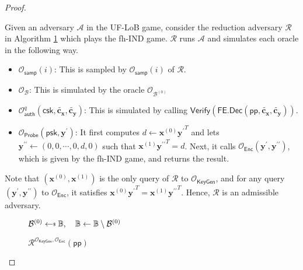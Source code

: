 \begin{proof}
\label{proof:ind-uf-lob3}

Given an adversary $\mathcal{A}$ in the \textsf{UF-LoB} game, consider the reduction adversary $\mathcal{R}$ in Algorithm \ref{alg:reduction1-ind-uf-lob3_game} which plays the \textsf{fh-IND} game. $\mathcal{R}$ runs $\mathcal{A}$ and simulates each oracle in the following way.

\begin{itemize}
	\item $\mathcal{O}_{\textsf{samp}}(i)$: This is sampled by $\mathcal{O}_{\textsf{samp}}(i)$ of $\mathcal{R}$.
	
	\item $\mathcal{O}_{\mathcal{B}}$: This is simulated by the oracle $\mathcal{O}_{\mathcal{B}^{(0)}}$

	\item $\mathcal{O}_{\textsf{auth}}^q (\textsf{csk}, \mathbf{\tilde{c_x}}, \mathbf{\tilde{c_y}})$: This is simulated by calling $\textsf{Verify}( \textsf{FE.Dec}(\textsf{pp}, \mathbf{\tilde{c_x}}, \mathbf{\tilde{c_y}}) )$.

	\item $\mathcal{O}_{\textsf{Probe}}( \textsf{psk}, \mathbf{y}^\prime )$: It first computes $d \gets \mathbf{x}^{(0)}{\mathbf{y}^\prime}^T$ and lets $\mathbf{y}^{\prime\prime} \gets (0, 0, \cdots, 0, d, 0)$ such that $\mathbf{x}^{(1)}{\mathbf{y}^{\prime\prime}}^T = d$. Next, it calls $\mathcal{O}_{\textsf{Enc}}(\mathbf{y}^\prime, {\mathbf{y}^{\prime\prime}})$, which is given by the \textsf{fh-IND} game, and returns the result.

\end{itemize}

\noindent Note that $(\mathbf{x}^{(0)}, \mathbf{x}^{(1)})$ is the only query of $\mathcal{R}$ to $\mathcal{O}_{\textsf{KeyGen}}$, and for any query $( \mathbf{y}^\prime, {\mathbf{y}^{\prime\prime}} )$ to $\mathcal{O}_{\textsf{Enc}}$, it satisfies $\mathbf{x}^{(0)}{\mathbf{y}^\prime}^T = \mathbf{x}^{(1)}{\mathbf{y}^{\prime\prime}}^T$. Hence, $\mathcal{R}$ is an admissible adversary.

\begin{figure}[h]
\centering
	
	\begin{minipage}[t]{0.5\linewidth}
	\centering
	\begin{algorithm}[H]
	\caption{$\mathcal{R}^{\mathcal{O}_{\textsf{KeyGen}}, \mathcal{O}_{\textsf{Enc}}}(\textsf{pp})$}
	\label{alg:reduction1-ind-uf-lob3_game}
	\begin{algorithmic}[1]
		\State $\mathcal{B}^{(0)} \getsdollar \mathbb{B}, \quad \mathbb{B} \gets \mathbb{B} \setminus \mathcal{B}^{(0)}$


\end{algorithmic}
\end{algorithm}
\end{minipage}
\end{figure}
\end{proof}
